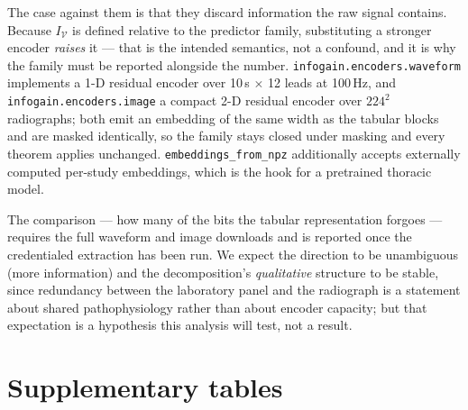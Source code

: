\documentclass[11pt]{article}
\newcommand{\fittable}[1]{%
  \resizebox{\ifdim\width>\linewidth\linewidth\else\width\fi}{!}{#1}}
\theoremstyle{definition}
\theoremstyle{remark}
\newcommand{\Vc}{\mathcal{V}}
\newcommand{\IV}{I_{\Vc}}
\begin{document}
The case against them is that they discard information the raw signal contains.
Because $\IV$ is defined relative to the predictor family, substituting a
stronger encoder \emph{raises} it --- that is the intended semantics, not a
confound, and it is why the family must be reported alongside the number.
\texttt{infogain.encoders.waveform} implements a 1-D residual encoder over
10\,s $\times$ 12 leads at 100\,Hz, and \texttt{infogain.encoders.image} a
compact 2-D residual encoder over $224^2$ radiographs; both emit an embedding of
the same width as the tabular blocks and are masked identically, so the family
stays closed under masking and every theorem applies unchanged.
\texttt{embeddings\_from\_npz} additionally accepts externally computed
per-study embeddings, which is the hook for a pretrained thoracic model.

The comparison --- how many of the bits the tabular representation forgoes ---
requires the full waveform and image downloads and is reported once the
credentialed extraction has been run. We expect the direction to be unambiguous
(more information) and the decomposition's \emph{qualitative} structure to be
stable, since redundancy between the laboratory panel and the radiograph is a
statement about shared pathophysiology rather than about encoder capacity; but
that expectation is a hypothesis this analysis will test, not a result.

\section{Supplementary tables}
\label{sec:s-tables}

\begin{table}[htbp]\centering\small
\caption{Numerical certification of every theoretical claim
(\texttt{python -m infogain.theory.verify}). ``Worst slack'' is the smallest
margin by which the inequality held across all trials; negative values of order
$10^{-13}$ reflect floating-point rounding at an equality case. All claims
pass: \thyAllHold.}
\label{tab:s-theory}
\fittable{}
\end{table}

\begin{table}[htbp]\centering\small
\caption{Simulation study: estimated against exact information by cohort size,
with the learning-curve-corrected estimate. Recovery approaches 100\% from
below, as a computationally bounded quantity must.}
\label{tab:s-recovery}
\fittable{}
\end{table}
\end{document}
